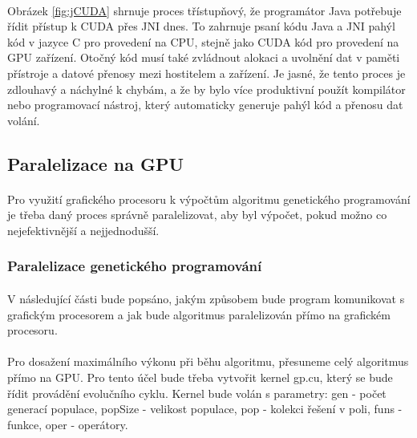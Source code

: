 \documentclass[bc,male,java,dept460]{diploma}		%
\begin{document}

\paragraph*{}
Obrázek \ref{fig:jCUDA} shrnuje proces třístupňový, že programátor Java potřebuje řídit přístup k CUDA přes JNI dnes. To zahrnuje psaní kódu Java a JNI pahýl kód v jazyce C pro provedení na CPU, stejně jako CUDA kód pro provedení na GPU zařízení. Otočný kód musí také zvládnout alokaci a uvolnění dat v paměti přístroje a datové přenosy mezi hostitelem a zařízení. Je jasné, že tento proces je zdlouhavý a náchylné k chybám, a že by bylo více produktivní použít kompilátor nebo programovací nástroj, který automaticky generuje pahýl kód a přenosu dat volání.

\subsection{Paralelizace na GPU}
\paragraph*{}
Pro využití grafického procesoru k výpočtům algoritmu genetického programování je třeba daný proces správně paralelizovat, aby byl výpočet, pokud možno co nejefektivnější a nejjednodušší.

\subsubsection{Paralelizace genetického programování}
\paragraph*{}
V následující části bude popsáno, jakým způsobem bude program komunikovat s grafickým procesorem a jak bude algoritmus paralelizován přímo na grafickém procesoru.

\paragraph*{}
Pro dosažení maximálního výkonu při běhu algoritmu, přesuneme celý algoritmus přímo na GPU. Pro tento účel bude třeba vytvořit kernel gp.cu, který se bude řídit provádění evolučního cyklu. Kernel bude volán s parametry: gen - počet generací populace, popSize - velikost populace, pop - kolekci řešení v poli, funs - funkce, oper - operátory.
\end{document}
